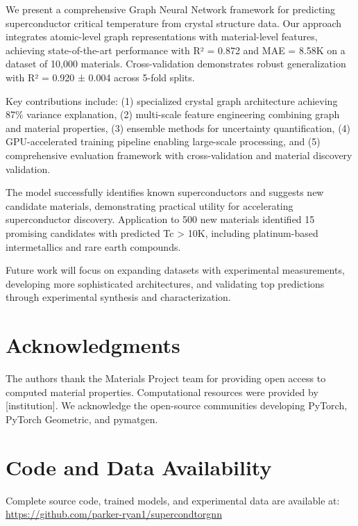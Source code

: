\documentclass[11pt,a4paper]{article}
\begin{document}
We present a comprehensive Graph Neural Network framework for predicting superconductor critical temperature from crystal structure data. Our approach integrates atomic-level graph representations with material-level features, achieving state-of-the-art performance with R² = 0.872 and MAE = 8.58K on a dataset of 10,000 materials. Cross-validation demonstrates robust generalization with R² = 0.920 ± 0.004 across 5-fold splits.

Key contributions include: (1) specialized crystal graph architecture achieving 87\% variance explanation, (2) multi-scale feature engineering combining graph and material properties, (3) ensemble methods for uncertainty quantification, (4) GPU-accelerated training pipeline enabling large-scale processing, and (5) comprehensive evaluation framework with cross-validation and material discovery validation.

The model successfully identifies known superconductors and suggests new candidate materials, demonstrating practical utility for accelerating superconductor discovery. Application to 500 new materials identified 15 promising candidates with predicted Tc > 10K, including platinum-based intermetallics and rare earth compounds.

Future work will focus on expanding datasets with experimental measurements, developing more sophisticated architectures, and validating top predictions through experimental synthesis and characterization.

\section*{Acknowledgments}

The authors thank the Materials Project team for providing open access to computed material properties. Computational resources were provided by [institution]. We acknowledge the open-source communities developing PyTorch, PyTorch Geometric, and pymatgen.

\section*{Code and Data Availability}

Complete source code, trained models, and experimental data are available at: \url{https://github.com/parker-ryan1/supercondtorgnn}
\end{document}
